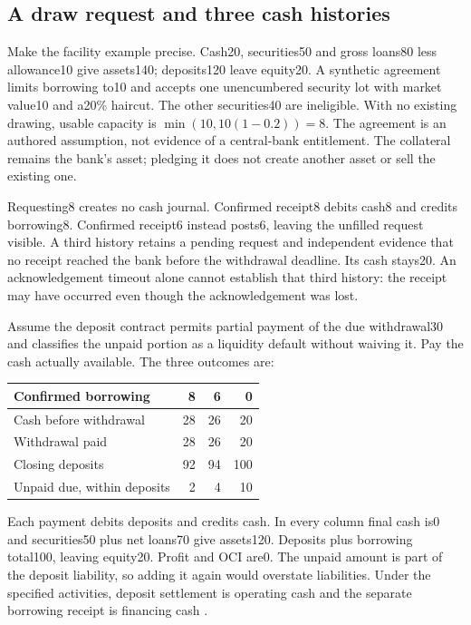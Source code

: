 \subsection{A draw request and three cash histories}\label{sec:bank-funding-settlement}

Make the facility example precise. Cash20, securities50 and gross loans80
less allowance10 give assets140; deposits120 leave equity20. A synthetic
agreement limits borrowing to10 and accepts one unencumbered security lot
with market value10 and a20\% haircut. The other securities40 are ineligible.
With no existing drawing, usable capacity is
$\min(10,10(1-0.2))=8$. The agreement is an authored assumption, not evidence
of a central-bank entitlement. The collateral remains the bank's asset;
pledging it does not create another asset or sell the existing one.

Requesting8 creates no cash journal. Confirmed receipt8 debits cash8 and
credits borrowing8. Confirmed receipt6 instead posts6, leaving the unfilled
request visible. A third history retains a pending request and independent
evidence that no receipt reached the bank before the withdrawal deadline.
Its cash stays20. An acknowledgement timeout alone cannot establish that
third history: the receipt may have occurred even though the acknowledgement
was lost.

Assume the deposit contract permits partial payment of the due withdrawal30
and classifies the unpaid portion as a liquidity default without waiving it.
Pay the cash actually available. The three outcomes are:

\begin{center}
\begin{tabular}{lrrr}
\toprule
Confirmed borrowing & 8 & 6 & 0\\
\midrule
Cash before withdrawal & 28 & 26 & 20\\
Withdrawal paid & 28 & 26 & 20\\
Closing deposits & 92 & 94 & 100\\
Unpaid due, within deposits & 2 & 4 & 10\\
\bottomrule
\end{tabular}
\end{center}

Each payment debits deposits and credits cash. In every column final cash
is0 and securities50 plus net loans70 give assets120. Deposits plus borrowing
total100, leaving equity20. Profit and OCI are0. The unpaid amount is part
of the deposit liability, so adding it again would overstate liabilities.
Under the specified activities, deposit settlement is operating cash and
the separate borrowing receipt is financing cash
\citep[paragraphs14--17]{aasb107dated}.

